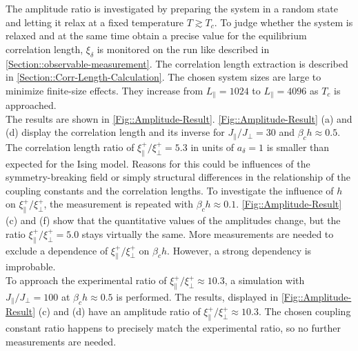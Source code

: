 	The amplitude ratio is investigated by preparing the system in a random state and letting it relax at a fixed temperature $T \gtrsim T_c$. To judge whether the system is relaxed and at the same time obtain a precise value for the equilibrium correlation length, $\xi_\delta$ is monitored on the run like described in \autoref{Section::observable-measurement}. The correlation length extraction is described in \autoref{Section::Corr-Length-Calculation}. The chosen system sizes are large to minimize finite-size effects. They increase from $L_\parallel =	1024$ to $L_\parallel =	4096$ as $T_c$ is approached. \\

	The results are shown in \autoref{Fig::Amplitude-Result}. \def\figureautorefname{Figures}\autoref{Fig::Amplitude-Result} (a) and (d) display the correlation length and its inverse for $J_\parallel /	J_\perp =	30$ and $\beta_c h \approx 0.5$. The correlation length ratio of $\xi_\parallel^+ /   \xi_\perp^+ = 5.3$ in units of $a_\delta =	1$ is smaller than expected for the Ising model. Reasons for this could be influences of the symmetry-breaking field or simply structural differences in the relationship of the coupling constants and the correlation lengths. To investigate the influence of $h$ on $\xi_\parallel^+ /   \xi_\perp^+$, the measurement is repeated with $\beta_c h \approx 0.1$. \autoref{Fig::Amplitude-Result}\def\figureautorefname{Fig.} (c) and (f) show that the quantitative values of the amplitudes change, but the ratio $\xi_\parallel^+ /   \xi_\perp^+ = 5.0$ stays virtually the same. More measurements are needed to exclude a dependence of $\xi^+_\parallel /	\xi^+_\perp$ on $\beta_c h$. However, a strong dependency is improbable. \\
	
	To approach the experimental ratio of $\xi_\parallel^+ /	\xi_\perp^+ \approx 10.3$, a simulation with $J_\parallel /	J_\perp =	100$ at $\beta_c h \approx 0.5$ is performed. The results, displayed in \def\figureautorefname{Figs.}\autoref{Fig::Amplitude-Result} (c) and (d) \def\figureautorefname{Fig.} have an amplitude ratio of $\xi_{\parallel}^+ /	\xi_\perp^+  \approx  10.3$. The chosen coupling constant ratio happens to precisely match the experimental ratio, so no further measurements are needed.  \\

